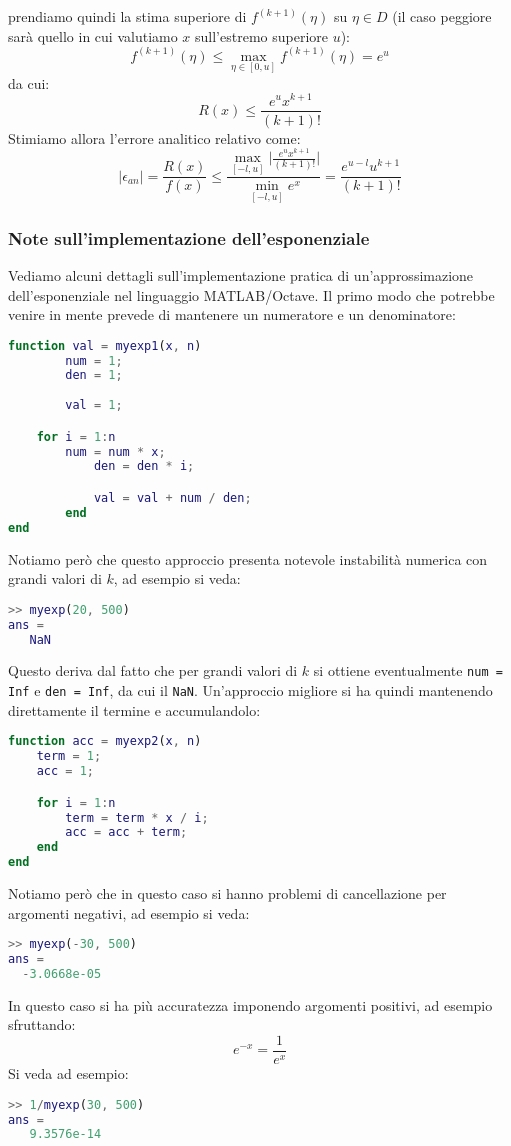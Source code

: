 \documentclass[a4paper,11pt]{article}
\begin{document}
prendiamo quindi la stima superiore di $f^{(k + 1)}(\eta)$ su $\eta \in D$ (il caso peggiore sarà quello in cui valutiamo $x$ sull'estremo superiore $u$):
$$
f^{(k + 1)} (\eta) \leq \max_{\eta \in [0, u]} f^{( k + 1)}(\eta) = e^u
$$
da cui:
$$
R(x) \leq \frac{e^u x^{k + 1}}{(k + 1)!}
$$
Stimiamo allora l'errore analitico relativo come:
$$
|\epsilon_{an}| = \frac{R(x)}{f(x)} \leq \frac{ \max_{[-l, u]} \Big| \frac{e^ux^{k + 1}}{(k + 1)!} \Big| }{ \min_{[-l, u]} e^x } = \frac{e^{u-l}u^{k+1}}{(k+1)!}
$$

\subsubsection{Note sull'implementazione dell'esponenziale}
Vediamo alcuni dettagli sull'implementazione pratica di un'approssimazione dell'esponenziale nel linguaggio MATLAB/Octave.
Il primo modo che potrebbe venire in mente prevede di mantenere un numeratore e un denominatore:
\begin{lstlisting}[language=matlab, style=codestyle]	
function val = myexp1(x, n)
		num = 1;
		den = 1;
		
		val = 1;

    for i = 1:n
    	num = num * x;
			den = den * i;

			val = val + num / den;
		end
end
\end{lstlisting}

Notiamo però che questo approccio presenta notevole instabilità numerica con grandi valori di $k$, ad esempio si veda:
\begin{lstlisting}[language=matlab, style=codestyle]	
>> myexp(20, 500)
ans =
   NaN
\end{lstlisting}

\lstset{language = matlab, style = codestyle}

Questo deriva dal fatto che per grandi valori di $k$ si ottiene eventualmente \lstinline|num = Inf| e \lstinline|den = Inf|, da cui il \lstinline|NaN|.
Un'approccio migliore si ha quindi mantenendo direttamente il termine e accumulandolo:
\begin{lstlisting}[language=matlab, style=codestyle]	
function acc = myexp2(x, n)
    term = 1;
    acc = 1;

    for i = 1:n
        term = term * x / i;
        acc = acc + term;
    end
end
\end{lstlisting}

Notiamo però che in questo caso si hanno problemi di cancellazione per argomenti negativi, ad esempio si veda:
\begin{lstlisting}[language=matlab, style=codestyle]	
>> myexp(-30, 500)
ans =
  -3.0668e-05
\end{lstlisting}
In questo caso si ha più accuratezza imponendo argomenti positivi, ad esempio sfruttando:
$$
e^{-x} = \frac{1}{e^x}
$$
Si veda ad esempio:
\begin{lstlisting}[language=matlab, style=codestyle]	
>> 1/myexp(30, 500)
ans =
   9.3576e-14
\end{lstlisting}
\end{document}
